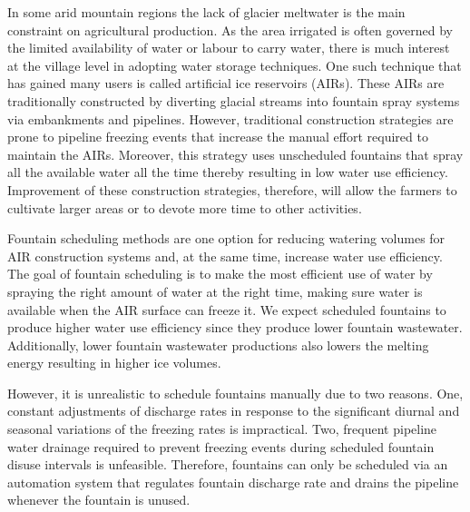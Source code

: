 \documentclass[tc, manuscript]{copernicus}
\begin{document}
\introduction

In some arid mountain regions the lack of glacier meltwater is the main constraint on agricultural production.
As the area irrigated is often governed by the limited availability of water or labour to carry water, there is
much interest at the village level in adopting water storage techniques. One such technique that has gained many
users is called artificial ice reservoirs (AIRs). These AIRs are traditionally constructed by diverting glacial
streams into fountain spray systems via embankments and pipelines. However, traditional construction strategies
are prone to pipeline freezing events that increase the manual effort required to maintain the AIRs. Moreover,
this strategy uses unscheduled fountains that spray all the available water all the time thereby resulting in
low water use efficiency. Improvement of these construction strategies, therefore, will allow the farmers to
cultivate larger areas or to devote more time to other activities. 

Fountain scheduling methods are one option for reducing watering volumes for AIR construction systems and, at
the same time, increase water use efficiency. The goal of fountain scheduling is to make the most efficient use
of water by spraying the right amount of water at the right time, making sure water is available when the AIR
surface can freeze it. We expect scheduled fountains to produce higher water use efficiency since they produce
lower fountain wastewater. Additionally, lower fountain wastewater productions also lowers the melting energy
resulting in higher ice volumes.

However, it is unrealistic to schedule fountains manually due to two reasons. One, constant adjustments of
discharge rates in response to the significant diurnal and seasonal variations of the freezing rates is
impractical. Two, frequent pipeline water drainage required to prevent freezing events during scheduled fountain
disuse intervals is unfeasible. Therefore, fountains can only be scheduled via an automation system that
regulates fountain discharge rate and drains the pipeline whenever the fountain is unused.
\end{document}
